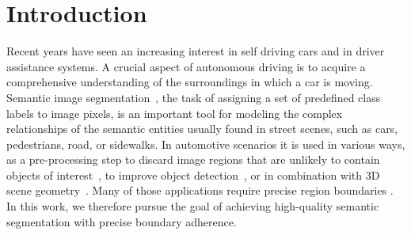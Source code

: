 \documentclass[10pt,twocolumn,letterpaper]{article}
\begin{document}
\vspace{-10pt}
\section{Introduction}


Recent years have seen an increasing interest in self driving cars and in driver assistance systems.
A crucial aspect of autonomous driving is to acquire a comprehensive understanding of the surroundings in which a car is moving.
%
Semantic image segmentation~\cite{Shotton08CVPR, Long15CVPR, Gould08IJCV, xiao09ICCV, Ladicky14CVPR}, the task of assigning a set of predefined class labels to image pixels, is an important tool for modeling the complex relationships of the semantic entities usually found in street scenes, such as cars, pedestrians, road, or sidewalks.
In automotive scenarios it is used in various ways, \eg as a pre-processing step to discard image regions that are unlikely to contain objects of interest~\cite{Osep16ICRA, Ess2009BMVC}, to improve object detection~\cite{Bansal09ICCVW, Gu09CVPR, Hariharan14ECCV, Zhu15CVPR}, or in combination with 3D scene geometry~\cite{Kundu14jECCV, Floros2012CVPR, Liu10CVPR}.
%
Many of those applications require precise region boundaries \cite{Ghiasi16ECCV}. In this work, we therefore pursue the goal of achieving high-quality semantic segmentation with precise boundary adherence.
\end{document}
